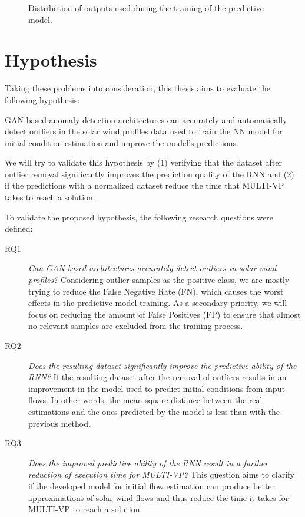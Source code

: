 \begin{figure}[ht]
\begin{subfigure}[b]{0.32\textwidth}
     \end{subfigure}
     \hfill
        \caption{Distribution of outputs used during the training of the predictive model.}
        \label{fig:output_distrib_bp}
\end{figure}


\section{Hypothesis}\label{sec:hypothesis}
Taking these problems into consideration, this thesis aims to evaluate the following hypothesis:
\begin{adjustwidth}{2cm}{}
    GAN-based anomaly detection architectures can accurately and automatically detect outliers in the solar wind profiles data used to train the NN model for initial condition estimation and improve the model's predictions.
\end{adjustwidth}

We will try to validate this hypothesis by (1) verifying that the dataset after outlier removal significantly improves the prediction quality of the RNN and (2) if the predictions with a normalized dataset reduce the time that MULTI-VP takes to reach a solution.

To validate the proposed hypothesis, the following research questions were defined:

\begin{description}
    \item[RQ1] \textit{Can GAN-based architectures accurately detect outliers in solar wind profiles?} Considering outlier samples as the positive class, we are mostly trying to reduce the False Negative Rate (FN), which causes the worst effects in the predictive model training. As a secondary priority, we will focus on reducing the amount of False Positives (FP) to ensure that almost no relevant samples are excluded from the training process.
    \item[RQ2] \textit{Does the resulting dataset significantly improve the predictive ability of the RNN?} If the resulting dataset after the removal of outliers results in an improvement in the model used to predict initial conditions from input flows. In other words, the mean square distance between the real estimations and the ones predicted by the model is less than with the previous method.
    \item[RQ3] \textit{Does the improved predictive ability of the RNN result in a further reduction of execution time for MULTI-VP?} This question aims to clarify if the developed model for initial flow estimation can produce better approximations of solar wind flows and thus reduce the time it takes for MULTI-VP to reach a solution.
\end{description}

